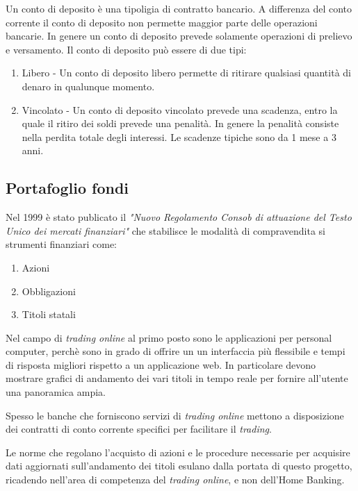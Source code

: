 \documentclass[10pt]{softeng} %
\begin{document}
Un conto di deposito \`e una tipoligia di contratto bancario.
A differenza del conto corrente il conto di deposito non permette maggior parte delle operazioni bancarie.
In genere un conto di deposito prevede solamente operazioni di prelievo e versamento.
Il conto di deposito pu\`o essere di due tipi:
\begin{enumerate}
    \item Libero - Un conto di deposito libero permette di ritirare qualsiasi quantit\`a di denaro in qualunque momento.
    \item Vincolato - Un conto di deposito vincolato prevede una scadenza, entro la quale il ritiro dei soldi prevede una penalit\`a. In genere la penalit\`a consiste nella perdita totale degli interessi. Le scadenze tipiche sono da 1 mese a 3 anni.
\end{enumerate}



\subsection{Portafoglio fondi}

Nel 1999 \`e stato publicato il \emph{ "Nuovo Regolamento Consob di attuazione del Testo Unico dei mercati finanziari"} che stabilisce le modalit\`a di compravendita si strumenti finanziari come:
\begin{enumerate}
    \item Azioni
    \item Obbligazioni
    \item Titoli statali
\end{enumerate}

Nel campo di \emph{trading online} al primo posto sono le applicazioni per personal computer, perch\`e sono in grado di offrire un un interfaccia pi\`u flessibile e tempi di risposta migliori rispetto a un applicazione web. In particolare devono mostrare grafici di andamento dei vari titoli in tempo reale per fornire all'utente una panoramica ampia.

Spesso le banche che forniscono servizi di \emph{trading online} mettono a disposizione dei contratti di conto corrente specifici per facilitare il \emph{trading}.

Le norme che regolano l'acquisto di azioni e le procedure necessarie per acquisire dati aggiornati sull'andamento dei titoli esulano dalla portata di questo progetto, ricadendo nell'area di competenza del \emph{trading online}, e non dell'Home Banking.
\end{document}
